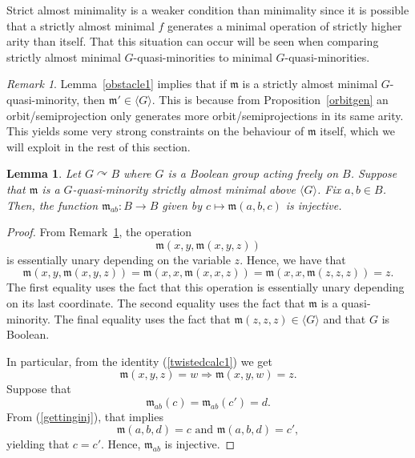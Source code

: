 \documentclass{article}
\newtheorem{lemma}[theorem]{Lemma}
\theoremstyle{remark}
\newtheorem{remark}[theorem]{Remark}
\theoremstyle{definition}
\def\acts{\curvearrowright}
\begin{document}
Strict almost minimality is a weaker condition than minimality since it is possible that a strictly  almost minimal $f$ generates a minimal operation of strictly higher arity than itself. That this situation can occur  will be seen  when comparing strictly almost minimal $G$-quasi-minorities to minimal $G$-quasi-minorities. 

\begin{remark}\label{rem:emprime} Lemma~\ref{obstacle1} implies that if $\mathfrak{m}$ is a strictly almost minimal $G$-quasi-minority, then $\mathfrak{m}'\in\langle G\rangle$. This is because from Proposition~\ref{orbitgen} an orbit\-/semiprojection only generates more orbit\-/semiprojections in its same arity. 
This yields some very strong constraints on the behaviour of $\mathfrak{m}$ itself, which we will exploit in the rest of this section.
\end{remark}



\begin{lemma}\label{injectivity} Let $G\acts B$ where $G$ is a Boolean group acting freely on $B$. Suppose that $\mathfrak{m}$ is a $G$-quasi-minority strictly almost minimal above $\langle G\rangle$. Fix $a,b\in B$. Then, the function $\mathfrak{m}_{ab}:B\to B$ given by $c\mapsto \mathfrak{m}(a,b,c)$ is injective.
\end{lemma}
\begin{proof} From Remark~\ref{rem:emprime}, the operation
\[\mathfrak{m}(x,y,\mathfrak{m}(x,y,z))\]
is essentially unary depending on the variable $z$. Hence, we have that
\begin{equation}\label{twistedcalc1}
    \mathfrak{m}(x,y,\mathfrak{m}(x,y,z))=\mathfrak{m}(x,x,\mathfrak{m}(x,x,z)) =\mathfrak{m}(x,x,\mathfrak{m}(z,z,z))=z.
\end{equation}
The first equality uses the fact that this operation is essentially unary depending on its last coordinate. The second equality uses the fact that $\mathfrak{m}$ is a quasi-minority. The final equality uses the fact that $\mathfrak{m}(z,z,z)\in\langle G\rangle$ and that $G$ is Boolean.

In particular, from the identity (\ref{twistedcalc1}) we get
\begin{equation}\label{gettinginj}
\mathfrak{m}(x,y,z)=w \Rightarrow \mathfrak{m}(x,y,w)=z.
\end{equation}
Suppose that 
\[\mathfrak m_{ab}(c)=\mathfrak m_{ab}(c')=d.\] 
From (\ref{gettinginj}), that implies 
\[\mathfrak{m}(a,b,d)=c \text{ and } \mathfrak{m}(a,b,d)=c',\]
yielding that $c=c'$. Hence, $\mathfrak m_{ab}$
 is injective.    
\end{proof}
\end{document}
